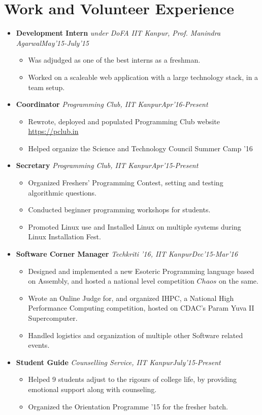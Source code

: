 \documentclass[11pt,a4paper]{moderncv}
\newcommand{\experience}[4]{
  \vspace{0.1cm}
\item \textbf{\large{#1}} \textit{#2}\hfill\textit{#3}
  \begin{itemize}[leftmargin=*]
    \setlength\itemsep{0em} #4
  \end{itemize}
}
\begin{document}
\section*{Work and Volunteer Experience}
\begin{itemize}
  \setlength\itemsep{0.5em}
  \experience{Development Intern}{under DoFA IIT Kanpur, Prof. Manindra Agarwal}{May'15-July'15}{
  \item Was adjudged as one of the best interns as a freshman.
  \item Worked on a scaleable web application with a large technology
    stack, in a team setup.
  }

  \experience{Coordinator}{Programming Club, IIT
    Kanpur}{Apr'16-Present}{
  \item Rewrote, deployed and populated Programming Club website \href{https://pclub.in}{https://pclub.in}
  \item Helped organize the Science and Technology Council Summer Camp
    '16
  }

  \experience{Secretary}{Programming Club, IIT Kanpur}{Apr'15-Present}{
  \item Organized Freshers’ Programming Contest, setting and testing algorithmic questions.
  \item Conducted beginner programming workshops for students.
  \item Promoted Linux use and Installed Linux on multiple systems during Linux Installation Fest.
  }

  \experience{Software Corner Manager}{Techkriti '16, IIT
    Kanpur}{Dec'15-Mar'16}{
  \item Designed and implemented a new Esoteric Programming language
    based on Assembly, and hosted a national level competition $Chaos$
    on the same.
  \item Wrote an Online Judge for, and organized IHPC, a National High Performance Computing competition, hosted on CDAC’s Param Yuva II Supercomputer.
  \item Handled logistics and organization of multiple other Software related events.
  }

  \experience{Student Guide}{Counselling Service, IIT Kanpur}{July'15-Present}{
  \item Helped 9 students adjust to the rigours of college life, by providing emotional support along with counseling.
  \item Organized the Orientation Programme '15 for the fresher batch.
  }

\end{itemize}
\end{document}
